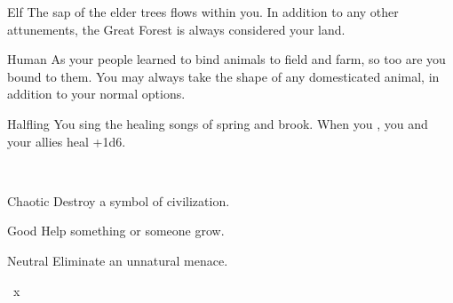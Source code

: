 \documentclass[8pt]{extarticle}
\begin{document}
\charbanner

\begin{minipage}[t]{3.2in}


\begin{optfeature}{Elf}
  The sap of the elder trees flows within you. In addition to any
  other attunements, the Great Forest is always considered your land.
\end{optfeature}

\begin{optfeature}{Human}
  As your people learned to bind animals to field and farm, so too are
  you bound to them. You may always take the shape of any domesticated
  animal, in addition to your normal options.
\end{optfeature}

\begin{optfeature}{Halfling}
  You sing the healing songs of spring and brook. When you , you and your allies heal +1d6.
\end{optfeature}

\ 


\begin{optfeature}{Chaotic}
  Destroy a symbol of civilization.
\end{optfeature}

\begin{optfeature}{Good}
  Help something or someone grow.
\end{optfeature}

\begin{optfeature}{Neutral}
  Eliminate an unnatural menace.
\end{optfeature}


\ x


\vfill\null
\end{minipage}
\end{document}
